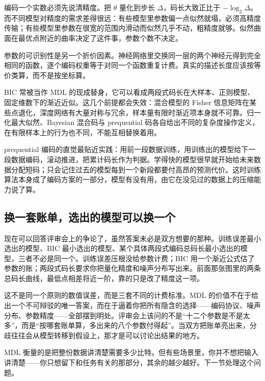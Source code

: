 编码一个实数必须先说清精度。把 \(\theta\) 量化到步长 \(\Delta\)，码长大致正比于 \(-\log_2\Delta\)。而不同模型对精度的需求差得很远：有些模型里参数偏一点似然就塌，必须高精度传输；有些模型里参数在很宽的范围内滑动而似然几乎不动，粗精度就够。似然曲面在最优点附近的曲率决定了这件事，参数个数不决定。

参数的可识别性是另一个折价因素。神经网络里交换同一层的两个神经元得到完全相同的函数，逐个编码权重等于对同一个函数重复计费。真实的描述长度应该按等价类算，而不是按坐标算。

BIC 常被当作 MDL 的现成替身，它可以看成两段式码长在大样本、正则模型、固定维数下的渐近近似。这几个前提都会失效：混合模型的 Fisher 信息矩阵在某些点退化，深度网络有大量对称与冗余，样本量有限时渐近项本身就不可靠。归一化最大似然、Bayesian 混合码与 prequential 码各自给出不同的复杂度操作定义，在有限样本上的行为也不同，不能互相替换着用。

prequential 编码的直觉最贴近实践：用前一段数据训练，用训练出的模型给下一段数据编码，滚动推进，把累计码长作为判据。学得快的模型很早就开始给未来数据分配短码；只会记住过去的模型每到一个新段都要付高昂的预测代价。这时训练算法本身成了编码方案的一部分，模型有没有用，由它在没见过的数据上的压缩能力说了算。

\subsection{换一套账单，选出的模型可以换一个}

现在可以回答评审会上的争论了，虽然答案未必是双方想要的那种。训练误差最小选出的模型、BIC 最小选出的模型、某个具体两段式编码总码长最小选出的模型，三者不必是同一个。训练误差压根没给参数计费；BIC 用一个渐近公式估了参数的账；两段式码长要求你把量化精度和噪声分布写出来。前面那张图里的两条总码长曲线，最低点相差将近一阶，靠的只是改了精度这一项。

这不是同一个原则的数值误差，而是三套不同的计费标准。MDL 的价值不在于给出一个不可辩驳的唯一答案，而在于逼着你把所有隐含的选择——编码协议、噪声分布、参数精度——全部摆到明处。评审会上该问的不是``十二个参数是不是太多''，而是``按哪套账单算，多出来的八个参数付得起''。当双方把账单亮出来，分歧往往会从模型转移到假设上，那才是可以讨论出结果的地方。

MDL 衡量的是把整份数据讲清楚需要多少比特。但有些场景里，你并不想把输入讲清楚——你只想留下和任务有关的那部分，其余的越少越好。下一节处理这个问题。
